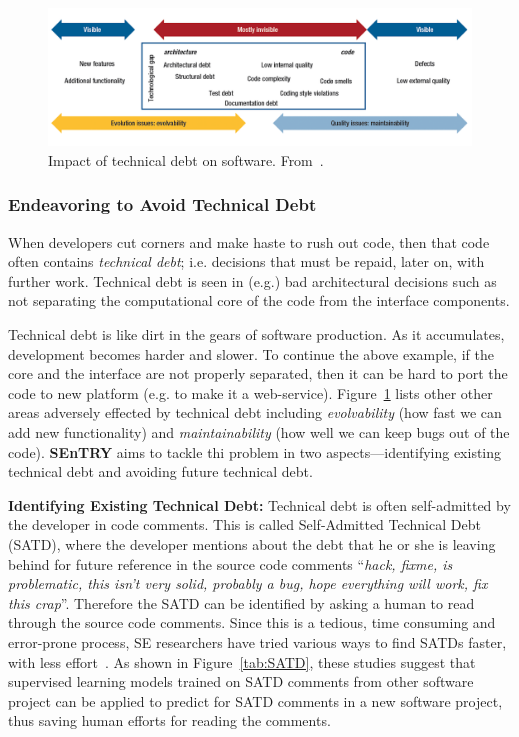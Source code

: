 \documentclass{NSF}
\newcommand{\fig}[1]{Figure~\ref{fig:#1}}
\newcommand{\IT}{{\bf {\sffamily SEnTRY}}}
\begin{document}
\begin{nsfdescription}
\begin{figure}[!b]
\begin{center}
\includegraphics[width=6in]{fig/debt.png}
\end{center}
\vspace{-7mm}
\caption{Impact of technical debt on software. From~\cite{Ozkaya12}.}\label{fig:debt}
\vspace{-2mm}
\end{figure}


\subsubsection{Endeavoring to Avoid Technical Debt}\label{tion:effort}
When developers cut corners and make haste to rush out code, then that code
often contains {\em technical debt}; i.e. decisions that must be repaid, later on, with further work.
Technical debt is seen in (e.g.) bad architectural decisions
such as not
separating the computational core of the code from the interface components. 


Technical debt is like dirt in the gears of software production.
As it accumulates,   development becomes harder and slower. To continue the above example,  if the core and the interface are not properly separated, then it can be hard to port the code to new platform (e.g. to make it a web-service).  
\fig{debt} lists other other areas  adversely effected by technical debt including {\em evolvability} (how fast we can add new functionality) and {\em maintainability} (how well we can keep bugs out of the code). {\IT} aims to tackle thi problem in two aspects---identifying existing technical debt and avoiding future    technical debt.


\textbf{Identifying Existing Technical Debt:} Technical debt is often self-admitted by the developer in code comments\cite{potdar2014exploratory}. This is called Self-Admitted Technical Debt (SATD), where the developer mentions about the debt that he or she is leaving behind for future reference in the source code comments 
``{\em hack, fixme, is problematic, this isn't very solid, probably a bug, hope everything will work, fix this crap}''. Therefore the SATD can be identified by asking a human to read through the source code comments. Since this is a tedious, time consuming and error-prone process, SE researchers have tried various ways to find SATDs faster, with less effort~\cite{maldonado2015detecting,maldonado2017using,huang2018identifying}. As shown in Figure~\ref{tab:SATD}, these studies suggest that supervised learning models trained on SATD comments from other software project can be applied to predict for SATD comments in a new software project, thus saving human efforts for reading the comments.



\end{nsfdescription}
\end{document}
